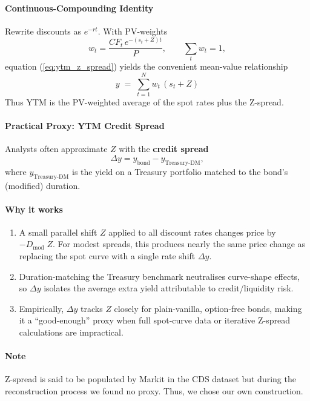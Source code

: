 \documentclass{article}
\begin{document}
\begin{appendices}
\paragraph*{Continuous-Compounding Identity}
Rewrite discounts as $e^{-r t}$. With PV-weights
\begin{equation*}
w_t=\frac{CF_t\,e^{-(s_t+Z)t}}{P},\qquad\sum_{t}w_t=1,
\end{equation*}
equation (\ref{eq:ytm_z_spread}) yields the convenient mean-value relationship
\begin{equation}
y \;=\; \sum_{t=1}^{N} w_t\,(s_t+Z)\tag{A2}
\end{equation}
Thus YTM is the PV-weighted average of the spot rates plus the Z-spread.

\paragraph*{Practical Proxy: YTM Credit Spread}
Analysts often approximate $Z$ with the \textbf{credit spread}
\begin{equation*}
\Delta y = y_{\text{bond}} - y_{\text{Treasury-DM}},
\end{equation*}
where $y_{\text{Treasury-DM}}$ is the yield on a Treasury portfolio matched to the bond's (modified) duration.

\paragraph*{Why it works}
\begin{enumerate}
    \item A small parallel shift $Z$ applied to all discount rates changes price by $-D_{\text{mod}}\;Z$. For modest spreads, this produces nearly the same price change as replacing the spot curve with a single rate shift $\Delta y$.
    \item Duration-matching the Treasury benchmark neutralises curve-shape effects, so $\Delta y$ isolates the average extra yield attributable to credit/liquidity risk.
    \item Empirically, $\Delta y$ tracks $Z$ closely for plain-vanilla, option-free bonds, making it a ``good-enough'' proxy when full spot-curve data or iterative Z-spread calculations are impractical.
\end{enumerate}

\paragraph*{Note}
Z-spread is said to be populated by Markit in the CDS dataset but during the reconstruction process we found no proxy. Thus, we chose our own construction.


\end{appendices}
\end{document}
